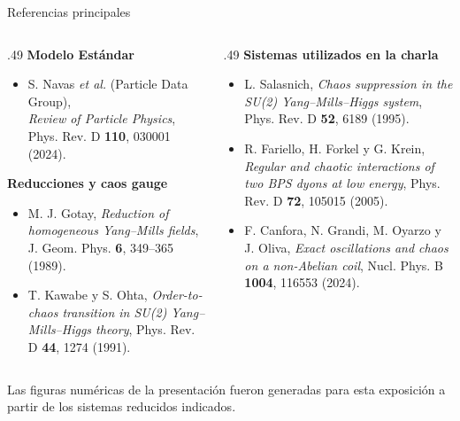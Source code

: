 \documentclass[10pt,aspectratio=169]{beamer}
\begin{document}
\begin{frame}{Referencias principales}
\vspace{-0.04cm}
\begin{columns}[T,totalwidth=.96\textwidth]
\begin{column}{.49\textwidth}
\small
\textbf{Modelo Estándar}
\begin{itemize}\setlength\itemsep{.22cm}
  \item S. Navas \textit{et al.} (Particle Data Group),\\
  \textit{Review of Particle Physics}, Phys. Rev. D \textbf{110}, 030001 (2024).
\end{itemize}

\vspace{0.12cm}
\textbf{Reducciones y caos gauge}
\begin{itemize}\setlength\itemsep{.22cm}
  \item M. J. Gotay, \textit{Reduction of homogeneous Yang--Mills fields}, J. Geom. Phys. \textbf{6}, 349--365 (1989).
  \item T. Kawabe y S. Ohta, \textit{Order-to-chaos transition in SU(2) Yang--Mills--Higgs theory}, Phys. Rev. D \textbf{44}, 1274 (1991).
\end{itemize}
\end{column}

\begin{column}{.49\textwidth}
\small
\textbf{Sistemas utilizados en la charla}
\begin{itemize}\setlength\itemsep{.22cm}
  \item L. Salasnich, \textit{Chaos suppression in the SU(2) Yang--Mills--Higgs system}, Phys. Rev. D \textbf{52}, 6189 (1995).
  \item R. Fariello, H. Forkel y G. Krein, \textit{Regular and chaotic interactions of two BPS dyons at low energy}, Phys. Rev. D \textbf{72}, 105015 (2005).
  \item F. Canfora, N. Grandi, M. Oyarzo y J. Oliva, \textit{Exact oscillations and chaos on a non-Abelian coil}, Nucl. Phys. B \textbf{1004}, 116553 (2024).
\end{itemize}
\end{column}
\end{columns}

\vfill
\begin{center}
{\scriptsize\color{black!60}Las figuras numéricas de la presentación fueron generadas para esta exposición a partir de los sistemas reducidos indicados.}
\end{center}
\end{frame}
\end{document}
